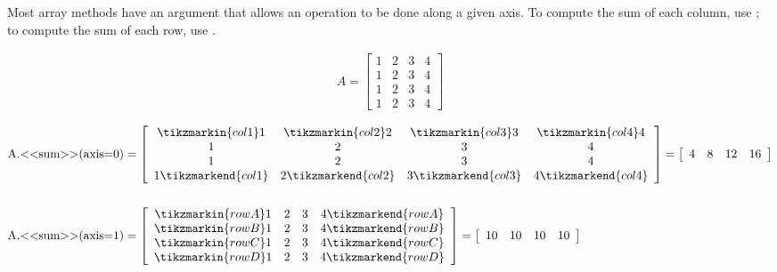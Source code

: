 Most array methods have an  argument that allows an operation to be done along a given axis.
To compute the sum of each column, use ; to compute the sum of each row, use .

\begin{align*}
A = \left[\begin{array}{cccc}
1 & 2 & 3 & 4\\
1 & 2 & 3 & 4\\
1 & 2 & 3 & 4\\
1 & 2 & 3 & 4
\end{array}\right]
\end{align*}

\begin{align*}
\text{\li{A.<<sum>>(axis=0)}} &= %
\left[\begin{array}{cccc}
\tikzmarkin{col1}1 & \tikzmarkin{col2}2 & \tikzmarkin{col3}3 & \tikzmarkin{col4}4\\
1 & 2 & 3 & 4\\
1 & 2 & 3 & 4\\
1\tikzmarkend{col1} & 2\tikzmarkend{col2} & 3\tikzmarkend{col3} & 4\tikzmarkend{col4}
\end{array}\right]
= \left[\begin{array}{cccc} 4 & 8 & 12 & 16 \end{array}\right]
\\ \\
\text{\li{A.<<sum>>(axis=1)}} &= %
\left[\begin{array}{cccc}
\tikzmarkin{rowA}1 & 2 & 3 & 4\tikzmarkend{rowA}\\
\tikzmarkin{rowB}1 & 2 & 3 & 4\tikzmarkend{rowB}\\
\tikzmarkin{rowC}1 & 2 & 3 & 4\tikzmarkend{rowC}\\
\tikzmarkin{rowD}1 & 2 & 3 & 4\tikzmarkend{rowD}\\
\end{array}\right]
= \left[\begin{array}{cccc} 10 & 10 & 10 & 10 \end{array}\right]
\end{align*}
